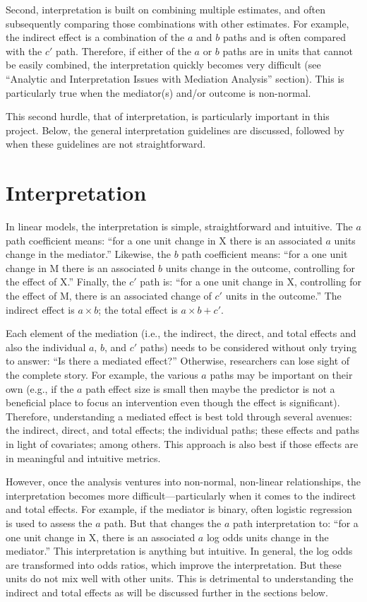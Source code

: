 \documentclass[]{DissertateUSU}
\begin{document}
Second, interpretation is built on combining multiple estimates, and
often subsequently comparing those combinations with other estimates.
For example, the indirect effect is a combination of the \(a\) and \(b\)
paths and is often compared with the \(c'\) path. Therefore, if either
of the \(a\) or \(b\) paths are in units that cannot be easily combined,
the interpretation quickly becomes very difficult (see ``Analytic and
Interpretation Issues with Mediation Analysis'' section). This is
particularly true when the mediator(s) and/or outcome is non-normal.

This second hurdle, that of interpretation, is particularly important in
this project. Below, the general interpretation guidelines are
discussed, followed by when these guidelines are not straightforward.

\section{Interpretation}\label{interpretation}

In linear models, the interpretation is simple, straightforward and
intuitive. The \(a\) path coefficient means: ``for a one unit change in
X there is an associated \(a\) units change in the mediator.'' Likewise,
the \(b\) path coefficient means: ``for a one unit change in M there is
an associated \(b\) units change in the outcome, controlling for the
effect of X.'' Finally, the \(c'\) path is: ``for a one unit change in
X, controlling for the effect of M, there is an associated change of
\(c'\) units in the outcome.'' The indirect effect is \(a \times b\);
the total effect is \(a \times b + c'\).

Each element of the mediation (i.e., the indirect, the direct, and total
effects and also the individual \(a\), \(b\), and \(c'\) paths) needs to
be considered without only trying to answer: ``Is there a mediated
effect?'' Otherwise, researchers can lose sight of the complete story.
For example, the various \(a\) paths may be important on their own
(e.g., if the \(a\) path effect size is small then maybe the predictor
is not a beneficial place to focus an intervention even though the
effect is significant). Therefore, understanding a mediated effect is
best told through several avenues: the indirect, direct, and total
effects; the individual paths; these effects and paths in light of
covariates; among others. This approach is also best if those effects
are in meaningful and intuitive metrics.

However, once the analysis ventures into non-normal, non-linear
relationships, the interpretation becomes more difficult---particularly
when it comes to the indirect and total effects. For example, if the
mediator is binary, often logistic regression is used to assess the
\(a\) path. But that changes the \(a\) path interpretation to: ``for a
one unit change in X, there is an associated \(a\) log odds units change
in the mediator.'' This interpretation is anything but intuitive. In
general, the log odds are transformed into odds ratios, which improve
the interpretation. But these units do not mix well with other units.
This is detrimental to understanding the indirect and total effects as
will be discussed further in the sections below.
\end{document}
